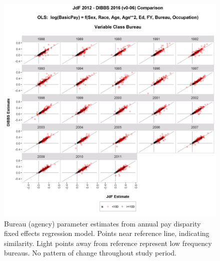 \documentclass[10pt, letterpaper]{article}
\begin{document}
\begin{spacing}{1.0}
\begin{figure}[]
    \centering
    \includegraphics[width=6in, trim={0 0 0 1in}, clip]{DIBBSEstimateVsJdFEstimateNoInterceptGSPayPlanFixedRefLevel-Bureau.png}
    \caption{Bureau (agency) parameter estimates from annual pay disparity fixed effects regression model.  Points near reference line, indicating similarity.  Light points away from reference represent low frequency bureaus.  No pattern of change throughout study period.}
    \label{figure:DIBBSEstimateVsJdFEstimateNoInterceptGSPayPlanFixedRefLevel-Bureau}
\end{figure}


\end{spacing}
\end{document}
